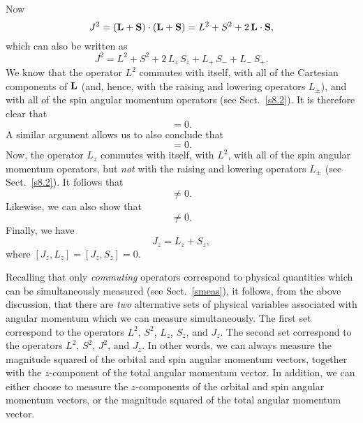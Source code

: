 Now
\begin{equation}
J^2 = ({\bf L}+{\bf S})\cdot({\bf L}+{\bf S}) = L^2+ S^2 + 2\,{\bf L}\cdot{\bf S},
\end{equation}
which can also be written as
\begin{equation}\label{e11.12}
J^2 = L^2+S^2 +2\,L_z\,S_z+ L_+\,S_-+L_-\,S_+.
\end{equation}
We know that the operator $L^2$ commutes with itself, with all of the
Cartesian components of ${\bf L}$ (and, hence, with the raising
and lowering operators $L_\pm$), and with all of the spin angular momentum
operators (see Sect.~\ref{s8.2}). It is therefore clear that
\begin{equation}
[J^2,L^2] = 0.
\end{equation}
A similar argument allows us to also conclude that
\begin{equation}
[J^2,S^2]=0.
\end{equation}
Now, the operator $L_z$ commutes with itself, with $L^2$, with all of
the spin angular momentum operators, but {\em not}\/ with the raising
and lowering operators $L_\pm$ (see Sect.~\ref{s8.2}). It follows that
\begin{equation}
[J^2,L_z]\neq 0.
\end{equation}
Likewise, we can also show that
\begin{equation}
[J^2,S_z]\neq 0.
\end{equation}
Finally, we have
\begin{equation}
J_z = L_z+S_z,
\end{equation}
where $[J_z,L_z]=[J_z,S_z]=0$. 

Recalling that only {\em commuting}\/ operators correspond to physical
quantities which can be simultaneously measured (see Sect.~\ref{smeas}),
it follows, from the above discussion,  that there  are {\em two}\/ alternative sets of
physical variables associated with angular momentum which we can measure simultaneously.
The first set correspond to the operators $L^2$, $S^2$, $L_z$, $S_z$, and $J_z$. The second set correspond to the operators
$L^2$, $S^2$, $J^2$, and $J_z$. In other words, we can always measure
the magnitude squared of the orbital and spin angular momentum vectors, together with
the $z$-component of the total angular momentum vector.
In addition, we can either choose to measure the $z$-components of
the orbital and spin angular momentum vectors, or the magnitude squared
of the total angular momentum vector.

